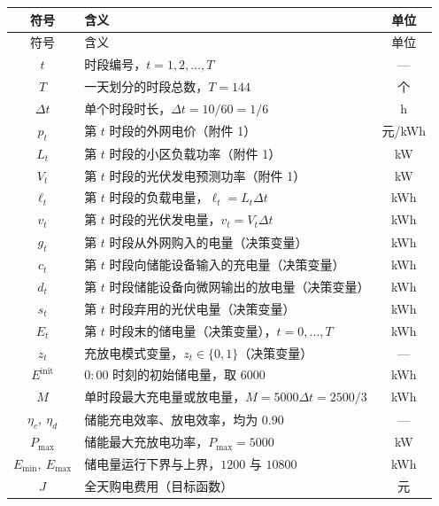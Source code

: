 \documentclass[withoutpreface,bwprint]{cumcmthesis}
\begin{document}
\begingroup
\def\LTcaptype{}
\footnotesize
\begin{longtable}{clc}
  \toprule
  符号 & 含义 & 单位 \\
  \midrule
  \endfirsthead
  \toprule
  符号 & 含义 & 单位 \\
  \midrule
  \endhead
  \bottomrule
  \endlastfoot
  $t$ & 时段编号，$t = 1, 2, \dots, T$ & --- \\
  $T$ & 一天划分的时段总数，$T = 144$ & 个 \\
  $\Delta t$ & 单个时段时长，$\Delta t = 10/60 = 1/6$ & h \\
  $p_t$ & 第 $t$ 时段的外网电价（附件 1） & 元/kWh \\
  $L_t$ & 第 $t$ 时段的小区负载功率（附件 1） & kW \\
  $V_t$ & 第 $t$ 时段的光伏发电预测功率（附件 1） & kW \\
  $\ell_t$ & 第 $t$ 时段的负载电量，$\ell_t = L_t \Delta t$ & kWh \\
  $v_t$ & 第 $t$ 时段的光伏发电量，$v_t = V_t \Delta t$ & kWh \\
  $g_t$ & 第 $t$ 时段从外网购入的电量（决策变量） & kWh \\
  $c_t$ & 第 $t$ 时段向储能设备输入的充电量（决策变量） & kWh \\
  $d_t$ & 第 $t$ 时段储能设备向微网输出的放电量（决策变量） & kWh \\
  $s_t$ & 第 $t$ 时段弃用的光伏电量（决策变量） & kWh \\
  $E_t$ & 第 $t$ 时段末的储电量（决策变量），$t = 0,\dots,T$ & kWh \\
  $z_t$ & 充放电模式变量，$z_t \in \{0,1\}$（决策变量） & --- \\
  $E^{\mathrm{init}}$ & $0{:}00$ 时刻的初始储电量，取 $6000$ & kWh \\
  $M$ & 单时段最大充电量或放电量，$M = 5000 \Delta t = 2500/3$ & kWh \\
  $\eta_c,\ \eta_d$ & 储能充电效率、放电效率，均为 $0.90$ & --- \\
  $P_{\max}$ & 储能最大充放电功率，$P_{\max} = 5000$ & kW \\
  $E_{\min},\ E_{\max}$ & 储电量运行下界与上界，$1200$ 与 $10800$ & kWh \\
  $J$ & 全天购电费用（目标函数） & 元 \\
\end{longtable}
\endgroup
\end{document}
